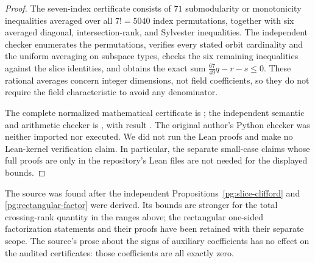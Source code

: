 \begin{proof}
The seven-index certificate consists of $71$ submodularity or
monotonicity inequalities averaged over all $7!=5040$ index
permutations, together with six averaged diagonal,
intersection-rank, and Sylvester inequalities. The independent
checker enumerates the permutations, verifies every stated orbit
cardinality and the uniform averaging on subspace types, checks
the six remaining inequalities against the slice identities, and
obtains the exact sum $\tfrac{67}{49}q-r-s\leq0$.
These rational averages concern integer dimensions, not field
coefficients, so they do not require the field characteristic to
avoid any denominator.

The complete normalized mathematical certificate is
; the independent
semantic and arithmetic checker is
, with result
.
The original author's Python checker was neither imported nor
executed. We did not run the Lean proofs and make no Lean-kernel
verification claim. In particular, the separate small-case claims
whose full proofs are only in the repository's Lean files are not
needed for the displayed bounds.
\end{proof}

The source was found after the independent
Propositions~\ref{pg:slice-clifford} and
\ref{pg:rectangular-factor} were derived. Its bounds are stronger
for the total crossing-rank quantity in the ranges above; the
rectangular one-sided factorization statements and their proofs
have been retained with their separate scope. The source's prose
about the signs of auxiliary coefficients has no effect on the
audited certificates: those coefficients are all exactly zero.

